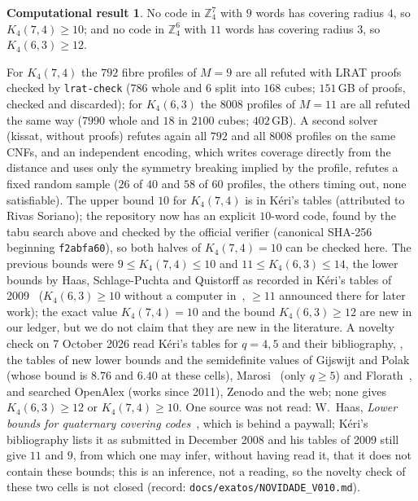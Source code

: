 \documentclass[11pt]{amsart}
\theoremstyle{definition}
\newtheorem{result}[theorem]{Computational result}
\theoremstyle{remark}
\begin{document}
\begin{result}\label{res:k474}
No code in $\mathbb{Z}_4^7$ with $9$ words has covering radius $4$, so $K_4(7,4)\ge 10$; and no code in $\mathbb{Z}_4^6$ with $11$ words has covering radius $3$, so $K_4(6,3)\ge 12$.
\end{result}
For $K_4(7,4)$ the $792$ fibre profiles of $M=9$ are all refuted with LRAT proofs checked by \texttt{lrat-check} ($786$ whole and $6$ split into $168$ cubes; $151$\,GB of proofs, checked and discarded); for $K_4(6,3)$ the $8008$ profiles of $M=11$ are all refuted the same way ($7990$ whole and $18$ in $2100$ cubes; $402$\,GB).
A second solver (kissat, without proofs) refutes again all $792$ and all $8008$ profiles on the same CNFs, and an independent encoding, which writes coverage directly from the distance and uses only the symmetry breaking implied by the profile, refutes a fixed random sample ($26$ of $40$ and $58$ of $60$ profiles, the others timing out, none satisfiable).
The upper bound $10$ for $K_4(7,4)$ is in Kéri's tables (attributed to Rivas Soriano); the repository now has an explicit $10$-word code, found by the tabu search above and checked by the official verifier (canonical SHA-256 beginning \texttt{f2abfa60}), so both halves of $K_4(7,4)=10$ can be checked here.
The previous bounds were $9\le K_4(7,4)\le 10$ and $11\le K_4(6,3)\le 14$, the lower bounds by Haas, Schlage-Puchta and Quistorff as recorded in Kéri's tables of 2009~\cite{keri} ($K_4(6,3)\ge 10$ without a computer in~\cite{hhs2009}, $\ge 11$ announced there for later work); the exact value $K_4(7,4)=10$ and the bound $K_4(6,3)\ge 12$ are new in our ledger, but we do not claim that they are new in the literature.
A novelty check on 7 October 2026 read Kéri's tables for $q=4,5$ and their bibliography, \cite{hhs2009}, the tables of new lower bounds and the semidefinite values of Gijswijt and Polak~\cite{gp2025} (whose bound is $8.76$ and $6.40$ at these cells), Marosi~\cite{marosi2026} (only $q\ge 5$) and Florath~\cite{florath2026}, and searched OpenAlex (works since 2011), Zenodo and the web; none gives $K_4(6,3)\ge 12$ or $K_4(7,4)\ge 10$.
One source was not read: W.~Haas, \emph{Lower bounds for quaternary covering codes}~\cite{haas2011}, which is behind a paywall; Kéri's bibliography lists it as submitted in December 2008 and his tables of 2009 still give $11$ and $9$, from which one may infer, without having read it, that it does not contain these bounds; this is an inference, not a reading, so the novelty check of these two cells is not closed (record: \texttt{docs/\allowbreak exatos/\allowbreak NOVIDADE\_\allowbreak V010.md}).
\end{document}
